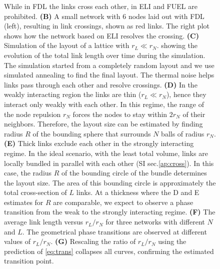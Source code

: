 \documentclass[nofootinbib,preprint,floatfix,titlepage,superscriptaddress]{revtex4} %
\begin{document}
\begin{figure}
{    While in FDL the links cross each other, in ELI and FUEL are prohibited. 
    {\bf(B)} A small network with 6 nodes laid out with FDL (left), resulting in link crossings, shown as red links.   
    The right plot shows how the network based on ELI resolves the crossing.
    {\bf (C)} Simulation of the layout of a lattice with $r_L\ll r_N$. 
    showing the evolution of the total link length over time during the simulation. %
    The simulation started from a completely random layout and we use simulated annealing to find the final layout.
    The thermal noise %
    helps links pass through each other and resolve crossings.
    {\bf (D)} In the weakly interacting region the links are thin ($r_L\ll r_N$), hence they interact only weakly with each other. 
    In this regime, the range of the node repulsion $r_N$ forces the nodes to stay within $2r_N$ of their neighbors. %
    Therefore, the layout size can be estimated by finding radius $R$ of the bounding sphere that surrounds $N$ balls of radius $r_N$. 
    {\bf (E)} Thick links exclude each other  in the strongly interacting regime. 
    In the ideal scenario, with the least total volume, links are locally bundled in parallel with each other (SI sec.\ref{ap:cross}). 
    In this case, the radius $R$ of the bounding circle of the bundle determines the layout size.
    The area of this bounding circle is approximately the total cross-section of $L$ links. 
    At a thickness where the D and E estimates for $R$ are comparable, we expect to observe a phase transition from the weak to the strongly interacting regime. 
    {\bf (F)} The average link length versus $r_L/r_N$ for three networks with different $N$ and $L$. %
    The geometrical phase transitions are observed at different values of $r_L/r_N$. 
    {\bf (G)} Rescaling the ratio of $r_L/r_N$ using the prediction of \eqref{eq:trans}  collapses all curves, %
    confirming the estimated transition point. }
    \label{fig:trans}
    \label{fig:crs-lat}
\end{figure}
\end{document}
